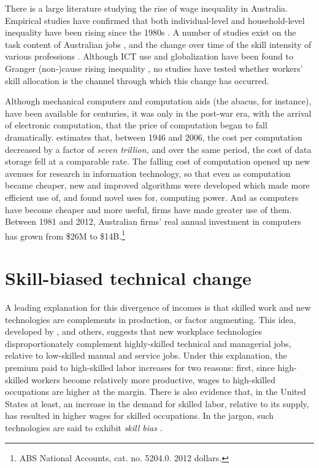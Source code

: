 \documentclass[a4paper,11pt,notitlepage]{article}
\begin{document}
There is a large literature studying the rise of wage inequality in Australia. Empirical studies have confirmed that both individual-level and household-level inequality have been rising since the 1980s \citep{Borland1999,Leigh2005,Gaston2009}. A number of studies exist on the task content of Australian jobs \citep{Esposto2012a}, and the change over time of the skill intensity of various professions \citep{Esposto2012, Esposto2012a}. Although ICT use and globalization have been found to Granger (non-)cause rising inequality \citep{Gaston2009}, no studies have tested whether workers' skill allocation is the channel through which this change has occurred.

Although mechanical computers and computation aids (the abacus, for instance), have been available for centuries, it was only in the post-war era, with the arrival of electronic computation, that the price of computation began to fall dramatically. \citet{Nordhaus2007} estimates that, between 1946 and 2006, the cost per computation decreased by a factor of {\em seven trillion,} and over the same period, the cost of data storage fell at a comparable rate. The falling cost of computation opened up new avenues for research in information technology, so that even as computation became cheaper, new and improved algorithms were developed which made more efficient use of, and found novel uses for, computing power. And as computers have become cheaper and more useful, firms have made greater use of them. Between 1981 and 2012, Australian firms' real annual investment in computers has grown from \$26M to \$14B.\footnote{ABS National Accounts, cat. no. 5204.0. 2012 dollars.}

\section{Skill-biased technical change}

A leading explanation for this divergence of incomes is that skilled work and new technologies are complements in production, or factor augmenting. This idea, developed by \citet{Tinbergen1974}, \citet{Katz1992} and others, suggests that new workplace technologies disproportionately complement highly-skilled technical and managerial jobs, relative to low-skilled manual and service jobs. Under this explanation, the premium paid to high-skilled labor increases for two reasons: first, since high-skilled workers become relatively more productive, wages to high-skilled occupations are higher at the margin. There is also evidence that, in the United States at least, an increase in the demand for skilled labor, relative to its supply, has resulted in higher wages for skilled occupations. In the jargon, such technologies are said to exhibit \emph{skill bias} \citep{Autor2006}.
\end{document}
